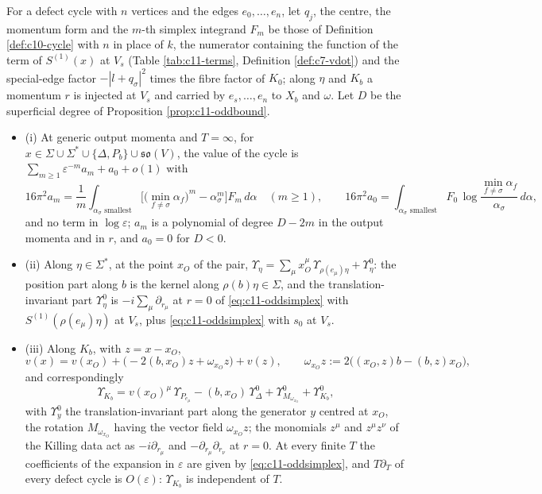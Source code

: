 \begin{theorem}
\label{thm:c11-oddsimplex}
For a defect cycle with $n$ vertices and the edges $e_0,\dots,e_n$, let $q_j$, the centre, the momentum form and the $m$-th simplex integrand $F_m$ be those of Definition \ref{def:c10-cycle} with $n$ in place of $k$, the numerator containing the function of the term of $S^{(1)}(x)$ at $V_s$ (Table \ref{tab:c11-terms}, Definition \ref{def:c7-vdot}) and the special-edge factor $-|l+q_\sigma|^2$ times the fibre factor of $K_0$; along $\eta$ and $K_b$ a momentum $r$ is injected at $V_s$ and carried by $e_s,\dots,e_n$ to $X_b$ and $\omega$. Let $D$ be the superficial degree of Proposition \ref{prop:c11-oddbound}.
\begin{itemize}
\item (i) At generic output momenta and $T=\infty$, for $x\in\Sigma\cup\Sigma^*\cup\{\Delta,P_b\}\cup\mathfrak{so}(V)$, the value of the cycle is $\sum_{m\ge1}\varepsilon^{-m}a_m+a_0+o(1)$ with
\begin{equation}
16\pi^2a_m=\frac1m\int_{\alpha_\sigma\text{ smallest}}\Big[\big(\min_{f\ne\sigma}\alpha_f\big)^m-\alpha_\sigma^m\Big]F_m\,d\alpha\quad(m\ge1),\qquad 16\pi^2a_0=\int_{\alpha_\sigma\text{ smallest}}F_0\,\log\frac{\min_{f\ne\sigma}\alpha_f}{\alpha_\sigma}\,d\alpha,
\label{eq:c11-oddsimplex}
\end{equation}
and no term in $\log\varepsilon$; $a_m$ is a polynomial of degree $D-2m$ in the output momenta and in $r$, and $a_0=0$ for $D<0$.
\item (ii) Along $\eta\in\Sigma^*$, at the point $x_O$ of the pair, $\Upsilon_\eta=\sum_\mu x_O^\mu\,\Upsilon_{\rho(e_\mu)\eta}+\Upsilon^0_\eta$: the position part along $b$ is the kernel along $\rho(b)\eta\in\Sigma$, and the translation-invariant part $\Upsilon^0_\eta$ is $-i\sum_\mu\partial_{r_\mu}$ at $r=0$ of \eqref{eq:c11-oddsimplex} with $S^{(1)}(\rho(e_\mu)\eta)$ at $V_s$, plus \eqref{eq:c11-oddsimplex} with $s_0$ at $V_s$.
\item (iii) Along $K_b$, with $z=x-x_O$,
\[
v(x)=v(x_O)+\big(-2(b,x_O)z+\omega_{x_O}z\big)+v(z),\qquad \omega_{x_O}z:=2\big((x_O,z)b-(b,z)x_O\big),
\]
and correspondingly
\begin{equation}
\Upsilon_{K_b}=v(x_O)^\mu\,\Upsilon_{P_{e_\mu}}-(b,x_O)\,\Upsilon^0_\Delta+\Upsilon^0_{M_{\omega_{x_O}}}+\Upsilon^0_{K_b},
\label{eq:c11-Kdec}
\end{equation}
with $\Upsilon^0_y$ the translation-invariant part along the generator $y$ centred at $x_O$, the rotation $M_{\omega_{x_O}}$ having the vector field $\omega_{x_O}z$; the monomials $z^\mu$ and $z^\mu z^\nu$ of the Killing data act as $-i\partial_{r_\mu}$ and $-\partial_{r_\mu}\partial_{r_\nu}$ at $r=0$. At every finite $T$ the coefficients of the expansion in $\varepsilon$ are given by \eqref{eq:c11-oddsimplex}, and $T\partial_T$ of every defect cycle is $O(\varepsilon)$: $\Upsilon_{K_b}$ is independent of $T$.

\end{itemize}
\end{theorem}
